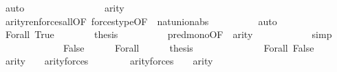\begin{isabellebody}
\ auto\isanewline
\ \ \ \ \ \ \isamarkupfalse%
\ {\isacartoucheopen}{\isasymphi}{\isasymin}{\isacharunderscore}{\kern0pt}{\isacartoucheclose}\isanewline
\ \ \ \ \ \ \isamarkupfalse%
\ {\isachardoublequoteopen}arity{\isacharparenleft}{\kern0pt}{\isacharquery}{\kern0pt}{\isasymphi}{\isacharprime}{\kern0pt}{\isacharparenright}{\kern0pt}\ {\isasymle}\ {}{\isachardoublequoteclose}\isanewline
\ \ \ \ \ \ \ \ \isamarkupfalse%
\ arity{\isacharunderscore}{\kern0pt}ren{\isacharunderscore}{\kern0pt}forces{\isacharunderscore}{\kern0pt}all{\isacharbrackleft}{\kern0pt}OF\ forces{\isacharprime}{\kern0pt}{\isacharunderscore}{\kern0pt}type{\isacharbrackleft}{\kern0pt}OF\ {\isacartoucheopen}{\isasymphi}{\isasymin}{\isacharunderscore}{\kern0pt}{\isacartoucheclose}{\isacharbrackright}{\kern0pt}{\isacharbrackright}{\kern0pt}\ nat{\isacharunderscore}{\kern0pt}union{\isacharunderscore}{\kern0pt}abs{}\isanewline
\ \ \ \ \ \ \ \ \isamarkupfalse%
\ auto\isanewline
\ \ \ \ \ \ \isamarkupfalse%
\ Forall\ True\isanewline
\ \ \ \ \ \ \isamarkupfalse%
\ {\isacharquery}{\kern0pt}thesis\isanewline
\ \ \ \ \ \ \ \ \isamarkupfalse%
\ pred{\isacharunderscore}{\kern0pt}mono{\isacharbrackleft}{\kern0pt}OF\ {\isacharunderscore}{\kern0pt}\ {\isacartoucheopen}arity{\isacharparenleft}{\kern0pt}{\isacharquery}{\kern0pt}{\isasymphi}{\isacharprime}{\kern0pt}{\isacharparenright}{\kern0pt}\ {\isasymle}\ {}{\isacartoucheclose}{\isacharbrackright}{\kern0pt}\isanewline
\ \ \ \ \ \ \ \ \isamarkupfalse%
\ simp\isanewline
\ \ \ \ \isamarkupfalse%
\isanewline
\ \ \isamarkupfalse%
\isanewline
\ \ \ \ \isamarkupfalse%
\ False\isanewline
\ \ \ \ \isamarkupfalse%
\ Forall\isanewline
\ \ \ \ \isamarkupfalse%
\ {\isacharquery}{\kern0pt}thesis\isanewline
\ \ \ \ \isamarkupfalse%
\ {\isacharminus}{\kern0pt}\isanewline
\ \ \ \ \ \ \isamarkupfalse%
\ Forall\ False\isanewline
\ \ \ \ \ \ \isamarkupfalse%
\ {\isachardoublequoteopen}arity{\isacharparenleft}{\kern0pt}{\isacharquery}{\kern0pt}{\isasymphi}{\isacharprime}{\kern0pt}{\isacharparenright}{\kern0pt}\ {\isacharequal}{\kern0pt}\ {}\ {\isasymunion}\ arity{\isacharparenleft}{\kern0pt}forces{\isacharprime}{\kern0pt}{\isacharparenleft}{\kern0pt}{\isasymphi}{\isacharparenright}{\kern0pt}{\isacharparenright}{\kern0pt}{\isachardoublequoteclose}\isanewline
\ \ \ \ \ \ \ \ {\isachardoublequoteopen}arity{\isacharparenleft}{\kern0pt}forces{\isacharprime}{\kern0pt}{\isacharparenleft}{\kern0pt}{\isasymphi}{\isacharparenright}{\kern0pt}{\isacharparenright}{\kern0pt}\ {\isasymle}\ {}\ {\isacharhash}{\kern0pt}{\isacharplus}{\kern0pt}\ arity{\isacharparenleft}{\kern0pt}{\isasymphi}{\isacharparenright}{\kern0pt}{\isachardoublequoteclose}\isanewline

\end{isabellebody}
